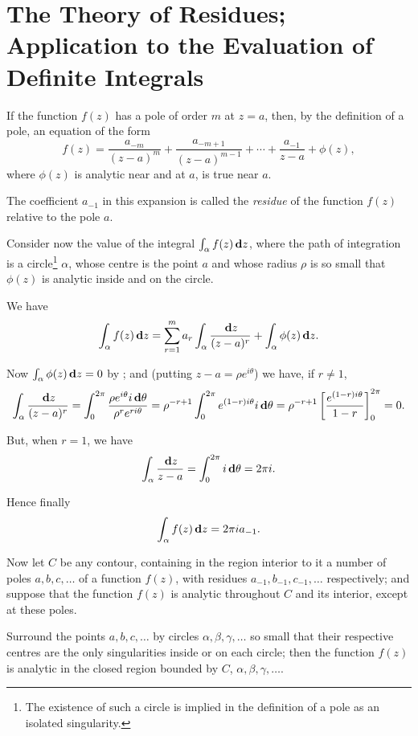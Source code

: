 \chapter{The Theory of Residues; Application to the Evaluation of Definite Integrals} 


If the function $f(z)$ has a pole of order $m$ at $z=a$, then, by the
definition of a pole, an equation of the form
$$
f(z)
=
\frac{a_{-m}}{ (z-a)^{m} }
+ \frac{ a_{-m+1} }{ (z-a)^{m-1} }
+ \cdots
+ \frac{a_{-1}}{z-a}
+ \phi(z),
$$
where $\phi(z)$ is analytic near and at $a$, is true near $a$.

The coefficient $a_{-1}$ in this expansion is called the \emph{residue} of the
function $f(z)$ relative to the pole $a$.

Consider now the value of the integral $\int_{\alpha} f(z) \, \mathbf{d} z$, where the path of
integration is a circle\footnote{The existence of such a circle is
  implied in the definition of a pole as an isolated singularity.}
$\alpha$, whose centre is the point $a$ and whose radius $\rho$ is so small
that $\phi(z)$ is analytic inside and on the circle.

We have
$$
\int_{\alpha} f(z) \, \mathbf{d} z
=
\sum_{r=1}^{m}
a_{r}
\int_{\alpha} \frac{\, \mathbf{d} z}{ (z-a)^{r}}
+
\int_{\alpha} \phi(z) \, \mathbf{d} z.
$$

Now $\int_{\alpha} \phi(z) \, \mathbf{d} z = 0$ by ;
and (putting $z-a = \rho e^{i\theta}$) we have, if $r \neq 1$,
$$
\int_{\alpha} \frac{ \, \mathbf{d} z}{ (z-a)^{r} }
=
\int_{0}^{2\pi} \frac{\rho e^{i\theta} i \, \mathbf{d} \theta}{ \rho^{r}
  e^{ri\theta}}
=
\rho^{-r+1}
\int_{0}^{2\pi} e^{(1-r)i\theta} i \, \mathbf{d} \theta
=
\rho^{-r+1}
\left[  \frac{e^{(1-r) i \theta}}{1-r}  \right]_{0}^{2\pi}
=
0.
$$

But, when $r = 1$, we have
$$
\int_{\alpha}
\frac{\, \mathbf{d} z}{z - a}
=
\int_{0}^{2\pi} i \, \mathbf{d} \theta
=
2\pi i.
$$

Hence finally
$$
\int_{\alpha} f(z) \, \mathbf{d} z = 2 \pi i a_{-1}.
$$

Now let $C$ be any contour, containing in the region interior to it a
number of poles $a,b,c,\ldots$ of a function $f(z)$, with residues
$a_{-1}, b_{-1}, c_{-1},\ldots$
respectively; and suppose that the function $f(z)$ is
analytic throughout $C$ and its interior, except at these poles.

Surround the points $a,b,c,\ldots$ by circles
$\alpha,\beta,\gamma,\ldots$
so small that their respective centres are the only singularities
inside or on each circle; then the function $f(z)$ is analytic in the
closed region bounded by $C$, $\alpha,\beta,\gamma,\ldots$.
%
%

